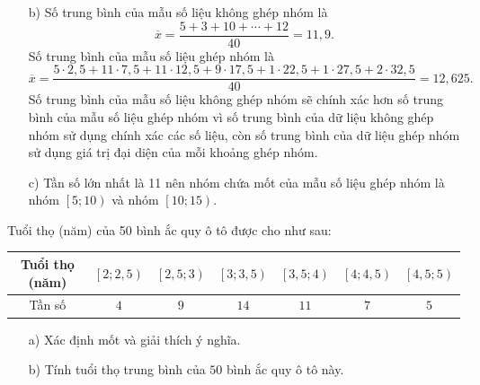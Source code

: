 \begin{bt}
{\begin{enumerate}
	\item [b)] Số trung bình của mẫu số liệu không ghép nhóm là
	$$\overline{x}=\dfrac{5+3+10+\cdots +12}{40}=11{,}9.$$
	Số trung bình của mẫu số liệu ghép nhóm là
	$$\overline{x}=\dfrac{5\cdot 2{,}5+11\cdot 7{,}5+11\cdot 12{,}5+9\cdot 17{,}5+1\cdot 22{,}5+1\cdot 27{,}5+2\cdot 32{,}5}{40}=12{,}625.$$
	Số trung bình của mẫu số liệu không ghép nhóm sẽ chính xác hơn số trung bình của mẫu số liệu ghép nhóm vì số trung bình của dữ liệu không ghép nhóm sử dụng chính xác các số liệu, còn số trung bình của dữ liệu ghép nhóm sử dụng giá trị đại diện của mỗi khoảng ghép nhóm.
	\item [c)] Tần số lớn nhất là 11 nên nhóm chứa mốt của mẫu số liệu ghép nhóm là nhóm $\left[5;10\right)$ và nhóm $\left[10;15\right)$.
\end{enumerate}
	}
\end{bt}

\begin{bt}%

Tuổi thọ (năm) của 50 bình ắc quy ô tô được cho như sau:
\begin{center}
	\begin{tabular}{|c|c|c|c|c|c|c|}
		\hline
		Tuổi thọ (năm)	& $\left[2;2{,}5 \right)$ & $\left[2{,}5;3 \right)$ & $\left[3;3{,}5 \right)$&$\left[3{,}5;4 \right)$&$\left[4;4{,}5 \right)$&$\left[4{,}5;5 \right)$  \\
		\hline
	Tần số &$4$	& $9$ & $14$ &$11$  & $7$&$5$ \\
		\hline
	\end{tabular}
\end{center}
\begin{enumerate}
	\item [a)] Xác định mốt và giải thích ý nghĩa.
	\item [b)] Tính tuổi thọ trung bình của $50$ bình ắc quy ô tô này.
\end{enumerate}	
	\loigiai{
\begin{enumerate}
	\item [a)] Tần số lớn nhất là $14$ nên nhóm chứa mốt là nhóm $\left[3;3, 5\right)$.\\
	Ta có $j=3$, $a_3=3$, $m_3=14$, $m_2=9$, $m_4=11$, $h=0$, $5$. Do đó
	$$M_o=3+\dfrac{14-9}{(14-9)+(14-11)}\cdot 0{,}5=3{,}3125.$$
	Tuổi thọ cao nhất của bình ắc quy khoảng $3{,}3125$ năm.
	\item [b)] Ta có bảng sau
	\begin{center}
	\begin{tabular}{|c|c|c|c|c|c|c|}
	\hline
	Tuổi thọ (năm)	& $2{,}25$ & $2{,}75$ & $3{,}25$&$3{,}75$&$4{,}25$&$4{,}75$  \\
	\hline
	Tần số &$4$	& $9$ & $14$ &$11$  & $7$&$5$\\
	\hline
\end{tabular}	
\end{center}
	Tuổi thọ trung bình của 50 bình ắc quy ô tô này là
	$$\overline{x}=\dfrac{2{,}25\cdot 4+2{,}75\cdot 9+3{,}25\cdot 14+3{,}75\cdot 11+4{,}25\cdot 7+4{,}75\cdot 5}{50}=3{,}48 \, \text{(năm)}.$$
\end{enumerate}	}
\end{bt}

